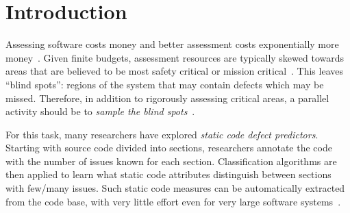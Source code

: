 \documentclass[10pt,conference]{IEEEtran}
\theoremstyle{break}
\theoremstyle{break}
\begin{document}
\IEEEpeerreviewmaketitle






\section{Introduction}
Assessing software costs money and better assessment costs exponentially more money~\cite{voas95,fu2016tuning}.  
Given finite budgets, assessment resources are typically skewed towards areas that are believed to be most safety critical or mission critical~\cite{lowryBK98}. This leaves ``blind spots'': regions of the system that may contain defects which may be missed. Therefore, in addition to rigorously assessing  critical areas, a parallel activity should be to {\em sample the blind spots}~\cite{Menzies04}. 

For this task, many researchers have explored  {\em static code defect predictors}.
Starting with source code divided into sections, researchers annotate the code with the number of issues known for each section.
Classification algorithms are then applied to learn what static code attributes
distinguish 
between sections with few/many issues.
Such static code measures can be automatically extracted from
the code base, with very little effort even for very large software
systems~\cite{Nagappan:2005}.  
\end{document}
